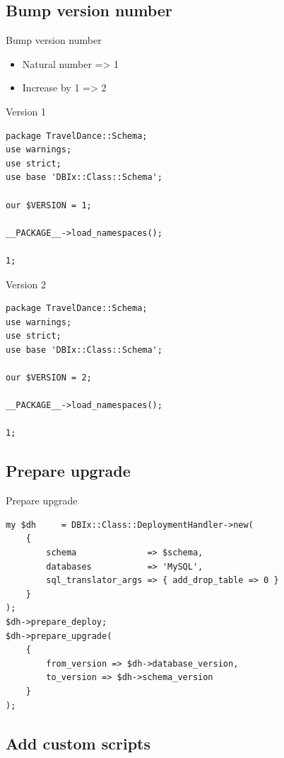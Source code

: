 \subsection{Bump version number}
\begin{frame}{Bump version number}
\begin{itemize}
\item Natural number => 1
\item Increase by 1 => 2
\end{itemize}
\end{frame}

\begin{frame}[fragile]{Version 1}
\begin{lstlisting}
package TravelDance::Schema;
use warnings;
use strict;
use base 'DBIx::Class::Schema';

our $VERSION = 1;

__PACKAGE__->load_namespaces();

1;
\end{lstlisting}
\end{frame}

\begin{frame}[fragile]{Version 2}
\begin{lstlisting}
package TravelDance::Schema;
use warnings;
use strict;
use base 'DBIx::Class::Schema';

our $VERSION = 2;

__PACKAGE__->load_namespaces();

1;
\end{lstlisting}
\end{frame}

\subsection{Prepare upgrade}

\begin{frame}[fragile]{Prepare upgrade}
\begin{lstlisting}
my $dh     = DBIx::Class::DeploymentHandler->new(
    {
        schema              => $schema,
        databases           => 'MySQL',
        sql_translator_args => { add_drop_table => 0 }
    }
);
$dh->prepare_deploy;
$dh->prepare_upgrade(
    {
        from_version => $dh->database_version,
        to_version => $dh->schema_version
    }
);
\end{lstlisting}
\end{frame}

\subsection{Add custom scripts}

